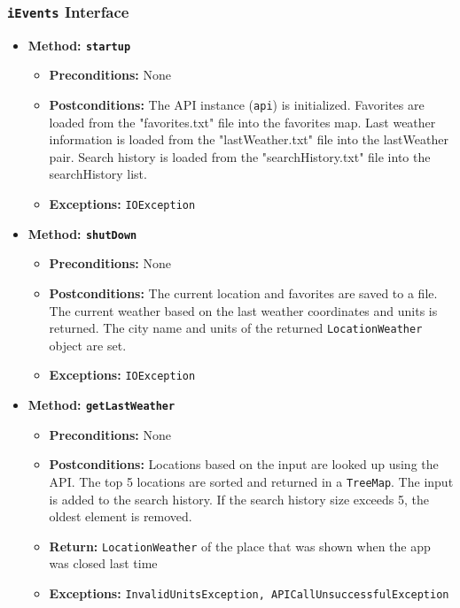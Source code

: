 \documentclass[a4paper,10pt]{article}
\begin{document}
\subsubsection*{\texttt{iEvents} Interface}

\begin{itemize}
    \item \textbf{Method: \texttt{startup}}
    \begin{itemize}
        \item \textbf{Preconditions:} None
        \item \textbf{Postconditions:} The API instance (\texttt{api}) is initialized. Favorites are loaded from the "favorites.txt" file into the favorites map. Last weather information is loaded from the "lastWeather.txt" file into the lastWeather pair. Search history is loaded from the "searchHistory.txt" file into the searchHistory list.
        \item \textbf{Exceptions:} \texttt{IOException}
    \end{itemize}
    
    \item \textbf{Method: \texttt{shutDown}}
    \begin{itemize}
        \item \textbf{Preconditions:} None
        \item \textbf{Postconditions:} The current location and favorites are saved to a file. The current weather based on the last weather coordinates and units is returned. The city name and units of the returned \texttt{LocationWeather} object are set.
        \item \textbf{Exceptions:} \texttt{IOException}
    \end{itemize}

    \item \textbf{Method: \texttt{getLastWeather}}
    \begin{itemize}
        \item \textbf{Preconditions:} None
        \item \textbf{Postconditions:} Locations based on the input are looked up using the API. The top 5 locations are sorted and returned in a \texttt{TreeMap}. The input is added to the search history. If the search history size exceeds 5, the oldest element is removed.
        \item \textbf{Return:} \texttt{LocationWeather} of the place that was shown when the app was closed last time
        \item \textbf{Exceptions:} \texttt{InvalidUnitsException, APICallUnsuccessfulException}
    \end{itemize}
    

\end{itemize}
\end{document}
